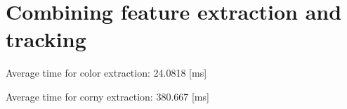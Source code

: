 %










\chapter{Combining feature extraction and tracking} %
\label{chap:combining_feature_extraction_and_tracking}

	\ifx \plots \yes
		\qRobotColorMediumPlot
	\fi

	\ifx \plots \yes
		\speedColorMediumPlot
	\fi

	\ifx \plots \yes
		\cameraPoseColorMediumPlot
	\fi

	\ifx \plots \yes
		\errorColorPlot
	\fi

	\ifx \plots \yes
		\qRobotCornyMediumPlot
	\fi

	\ifx \plots \yes
		\speedCornyMediumPlot
	\fi

	\ifx \plots \yes
		\cameraPoseCornyMediumPlot
	\fi

	\ifx \plots \yes
		\errorCornyPlot
	\fi

Average time for color extraction: 24.0818 [ms]

Average time for corny extraction: 380.667 [ms]

